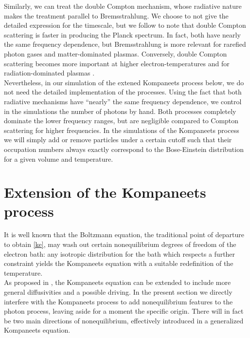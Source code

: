 \documentclass[a4paper,12pt,reqno,superscriptaddress,nofootinbib]{revtex4}
\theoremstyle{plain}
\theoremstyle{definition}
\theoremstyle{remark}
\newcommand{\0}{^{(0)}}
\newcommand{\1}{^{(1)}}
\newcommand{\2}{^{(2)}}
\begin{document}
Similarly, we can treat the double Compton mechanism, whose radiative nature makes the treatment parallel to Bremsstrahlung. We choose to not give the detailed expression for the timescale, but we follow \cite{lightman} to note that double Compton scattering is faster in producing the Planck spectrum. In fact, both have nearly the same frequency dependence, but Bremsstrahlung is more relevant for rarefied photon gases and matter-dominated plasmas. Conversely, double Compton scattering becomes more important at higher electron-temperatures and for radiation-dominated plasmas \cite{lightman}. \\

 Nevertheless, in our simulation of the extened Kompaneets process below, we do not need the detailed implementation of the 
processes.  Using the fact that both radiative mechanisms have 
``nearly'' the same frequency dependence, we control in the 
simulations the number of photons by hand.   Both processes completely 
dominate the lower frequency ranges, but are negligible compared to Compton 
scattering for higher frequencies. In the simulations of the Kompaneets process we will simply add or remove particles under a 
certain cutoff such that their occupation numbers always exactly correspond to 
the Bose-Einstein distribution for a given volume and temperature.


\section{Extension of the Kompaneets process}\label{extk-sec}

It is well known that the Boltzmann equation, the traditional point of departure to obtain \eqref{ke}, may wash out certain nonequilibrium degrees of freedom of the electron bath: any isotropic distribution \cite{barbosa,brown,brown2, peebles} for the bath which respects a further constraint \cite{paper} yields the Kompaneets equation with a suitable redefinition of the temperature.\\
As proposed in \cite{paper}, the Kompaneets equation can be extended to include more general diffusivities and a possible driving.   In the present section we directly interfere with the Kompaneets process to add nonequilibrium features to the photon process, leaving aside for a moment the specific origin.  There will in fact be two main directions of nonequilibrium, effectively introduced in a generalized Kompaneets equation.\\
\end{document}
